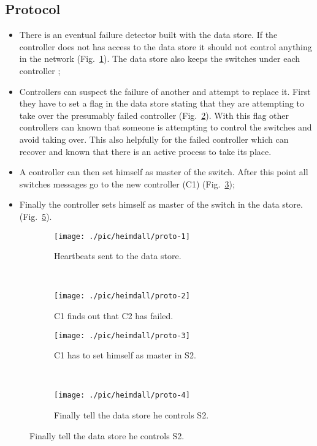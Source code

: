 \subsection{Protocol}
\begin{itemize}
\item There is an eventual failure detector built with the data store. If the controller does not has access to the data store it should not control anything in the network (Fig.~\ref{fig:proto-heartbeats}). The data store also keeps the switches under each controller ; 
\item Controllers can suspect the failure of another and attempt to replace it. First they have to set a flag in the data store stating that they are attempting to take over the presumably failed controller (Fig.~\ref{fig:proto-c2-fails}). With this flag other controllers can known that someone is attempting to control the switches and avoid taking over. This also helpfully for the failed controller which can recover and known that there is an active process to take its place. 
\item A controller can then set himself as master of the switch. After this point all switches messages go to the new controller (C1) (Fig.~\ref{fig:proto-c1-as-master}); 
\item Finally the controller sets himself as master of the switch in the data store. (Fig.~\ref{fig:proto-c1-finishes}). 
\end{itemize}


\begin{figure}
  \centering
  \begin{subfigure}[b]{0.5\textwidth}
                \centering
                \texttt{[image: ./pic/heimdall/proto-1]}
                \caption{Heartbeats sent to the data store. }
                \label{fig:proto-heartbeats}
        \end{subfigure}%
        ~
        \begin{subfigure}[b]{0.5\textwidth}
                \centering
                \texttt{[image: ./pic/heimdall/proto-2]}
                \caption{C1 finds out that C2 has failed.}
                \label{fig:proto-c2-fails}
        \end{subfigure}

  \begin{subfigure}[b]{0.5\textwidth}
                \centering
                \texttt{[image: ./pic/heimdall/proto-3]}
                \caption{C1 has to set himself as master in S2. }
                \label{fig:proto-c1-as-master}
        \end{subfigure}%
        ~
        \begin{subfigure}[b]{0.5\textwidth}
                \centering
                \texttt{[image: ./pic/heimdall/proto-4]}
                \caption{Finally tell the data store he controls S2. }
                \label{fig:proto-c1-finishes}
        \end{subfigure}
\end{figure}

